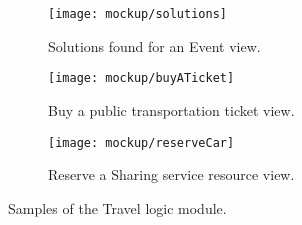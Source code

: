 \begin{figure}[H]	
	\begin{subfigure}{0.5\linewidth}
		\centering		
		\texttt{[image: mockup/solutions]} 
		\caption{Solutions found for an Event view.}
		\label{fig:solutions}
	\end{subfigure}
	\begin{subfigure}{0.5\linewidth}
		\texttt{[image: mockup/buyATicket]} 
		\centering
		\caption{Buy a public transportation ticket view.}
		\label{fig:buyTicket}
	\end{subfigure} 
	\hfill
	
	\bigskip	
	\begin{subfigure}{\linewidth}
			\centering
		\texttt{[image: mockup/reserveCar]} 
		\caption{Reserve a Sharing service resource view.}
		\label{fig:reserveCar}
	\end{subfigure}

	\caption{Samples of the Travel logic module.}
	\label{fig:travelLogic}
\end{figure}